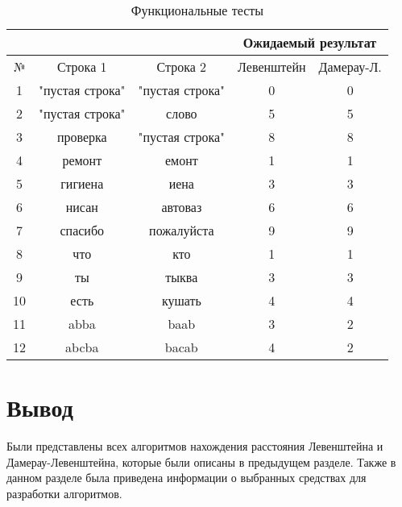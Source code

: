 \begin{table}[h]
	\begin{center}
        \begin{threeparttable}
        \captionsetup{justification=raggedright,singlelinecheck=off}
		\caption{\label{tbl:functional_test} Функциональные тесты}
		\begin{tabular}{|c|c|c|c|c|}
			\hline
			& & & \multicolumn{2}{c|}{Ожидаемый результат} \\
			\hline
			№&Строка 1&Строка 2&Левенштейн&Дамерау-Л. \\
			\hline
            1&"пустая строка"&"пустая строка"&0&0 \\
            \hline
            2&"пустая строка"&слово&5&5 \\
            \hline
            3&проверка&"пустая строка"&8&8 \\
            \hline
            4&ремонт&емонт&1&1 \\
			\hline
			5&гигиена&иена&3&3 \\
			\hline
            6&нисан&автоваз&6&6 \\
			\hline
			7&спасибо&пожалуйста&9&9 \\
			\hline
            8&что&кто&1&1 \\
			\hline
            9&ты&тыква&3&3 \\
			\hline
            10&есть&кушать&4&4 \\
			\hline
			11&abba&baab&3&2 \\
			\hline
            12&abcba&bacab&4&2 \\
			\hline
		\end{tabular}
        \end{threeparttable}
	\end{center}
\end{table}

\section{Вывод}

Были представлены всех алгоритмов нахождения расстояния Левенштейна и Дамерау-Левенштейна, которые были описаны в предыдущем разделе. Также в данном разделе была приведена информации о выбранных средствах для разработки алгоритмов.
